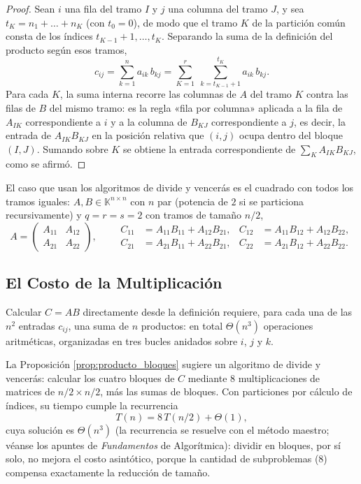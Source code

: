 \documentclass[11pt, a4paper]{article}
\begin{document}
\begin{proof}
Sean $i$ una fila del tramo $I$ y $j$ una columna del tramo $J$, y sea $t_K = n_1 + \dots + n_K$ (con $t_0 = 0$), de modo que el tramo $K$ de la partición común consta de los índices $t_{K-1} + 1, \dots, t_K$. Separando la suma de la definición del producto según esos tramos,
\[
c_{ij} = \sum_{k=1}^{n} a_{ik} \, b_{kj} = \sum_{K=1}^{r} \; \sum_{k = t_{K-1}+1}^{t_K} a_{ik} \, b_{kj}.
\]
Para cada $K$, la suma interna recorre las columnas de $A$ del tramo $K$ contra las filas de $B$ del mismo tramo: es la regla «fila por columna» aplicada a la fila de $A_{IK}$ correspondiente a $i$ y a la columna de $B_{KJ}$ correspondiente a $j$, es decir, la entrada de $A_{IK} B_{KJ}$ en la posición relativa que $(i, j)$ ocupa dentro del bloque $(I, J)$. Sumando sobre $K$ se obtiene la entrada correspondiente de $\sum_{K} A_{IK} B_{KJ}$, como se afirmó.
\end{proof}

El caso que usan los algoritmos de divide y vencerás es el cuadrado con todos los tramos iguales: $A, B \in \mathbb{K}^{n \times n}$ con $n$ par (potencia de $2$ si se particiona recursivamente) y $q = r = s = 2$ con tramos de tamaño $n/2$,
\[
A = \begin{pmatrix} A_{11} & A_{12} \\ A_{21} & A_{22} \end{pmatrix},
\qquad
\begin{aligned}
C_{11} &= A_{11} B_{11} + A_{12} B_{21}, & C_{12} &= A_{11} B_{12} + A_{12} B_{22}, \\
C_{21} &= A_{21} B_{11} + A_{22} B_{21}, & C_{22} &= A_{21} B_{12} + A_{22} B_{22}.
\end{aligned}
\]

\subsection{El Costo de la Multiplicación}

Calcular $C = AB$ directamente desde la definición requiere, para cada una de las $n^2$ entradas $c_{ij}$, una suma de $n$ productos: en total $\Theta(n^3)$ operaciones aritméticas, organizadas en tres bucles anidados sobre $i$, $j$ y $k$.

La Proposición \ref{prop:producto_bloques} sugiere un algoritmo de divide y vencerás: calcular los cuatro bloques de $C$ mediante $8$ multiplicaciones de matrices de $n/2 \times n/2$, más las sumas de bloques. Con particiones por cálculo de índices, su tiempo cumple la recurrencia
\[
T(n) = 8 \, T(n/2) + \Theta(1),
\]
cuya solución es $\Theta(n^3)$ (la recurrencia se resuelve con el método maestro; véanse los apuntes de \emph{Fundamentos} de Algorítmica): dividir en bloques, por sí solo, no mejora el costo asintótico, porque la cantidad de subproblemas ($8$) compensa exactamente la reducción de tamaño.
\end{document}
